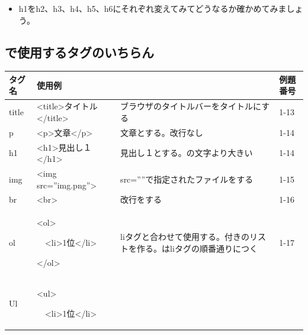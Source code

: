 \documentclass[a4paper,12pt]{jarticle}
\begin{document}
\vfill

\theQuestion\label{Q:hasAnswer04-2}

\begin{itemize}
  \item[]
    h1をh2、h3、h4、h5、h6にそれぞれ変えてみてどうなるか確かめてみましょう。
\end{itemize}

\bigskip

\clearpage\subsection{で使用するタグのいちらん}
{\small
  \begin{center}
    \tablefirsthead{}
    \tablehead{}
    \tabletail{}
    \tablelasttail{}
    \begin{supertabular}{|m{1.6cm}|m{5.1060004cm}|m{7.8930006cm}|m{2.037cm}|}
      \hline
      タグ名 &
      使用例 &
       &
      例題番号\\\hline
      title &
      {\textless}title{\textgreater}タイトル{\textless}/title{\textgreater} &
      ブラウザのタイトルバーをタイトルにする
      &
      1-13\\\hline
      p &
      {\textless}p{\textgreater}文章{\textless}/p{\textgreater} &
      文章とする。改行なし &
      1-14\\\hline
      h1 &
      {\textless}h1{\textgreater}見出し１{\textless}/h1{\textgreater} &
      見出し１とする。の文字より大きい
      &
      1-14\\\hline
      img &
      {\textless}img src=”img.png”{\textgreater} &
      src=””で指定されたファイルをする
      &
      1-15\\\hline
      br &
      {\textless}br{\textgreater} &
      改行をする &
      1-16\\\hline
      ol &
      {\textless}ol{\textgreater}

      \ \ {\textless}li{\textgreater}1位{\textless}/li{\textgreater}

      {\textless}/ol{\textgreater} &
      liタグと合わせて使用する。付きのリストを作る。はliタグの順番通りにつく
      &
      1-17\\\hline
      Ul &
      {\textless}ul{\textgreater}

      \ \ {\textless}li{\textgreater}1位{\textless}/li{\textgreater}


\end{supertabular}
\end{center}}
\end{document}
